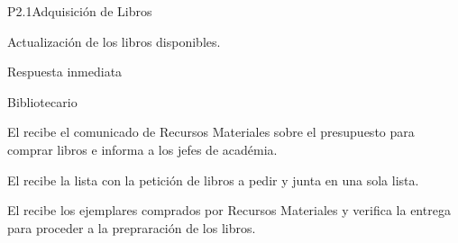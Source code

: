 \begin{Proceso}{P2.1}{Adquisición de Libros}
   { %
    \begin{UClist}
		\UCli	Actualización de los libros disponibles.
    \end{UClist}
  }

   { %
  }

   { %
    \begin{UClist}
      \UCli Respuesta inmediata
    \end{UClist}
  }
   { %
  }


\end{Proceso}
\begin{PDescripcion}

  \Ppaso Bibliotecario
	\begin{enumerate}
		\Ppaso[\itarea]  El  recibe el comunicado de Recursos Materiales sobre el presupuesto para comprar libros e informa a los jefes de académia.
	\end{enumerate}

	\begin{enumerate}
		\Ppaso[\itarea]  El  recibe la lista con la petición de libros a pedir y junta en una sola lista.
	\end{enumerate}

	\begin{enumerate}
		\Ppaso[\itarea]  El  recibe los ejemplares comprados por Recursos Materiales y verifica la entrega para proceder a la prepraración de los libros.
	\end{enumerate}	
\end{PDescripcion}




